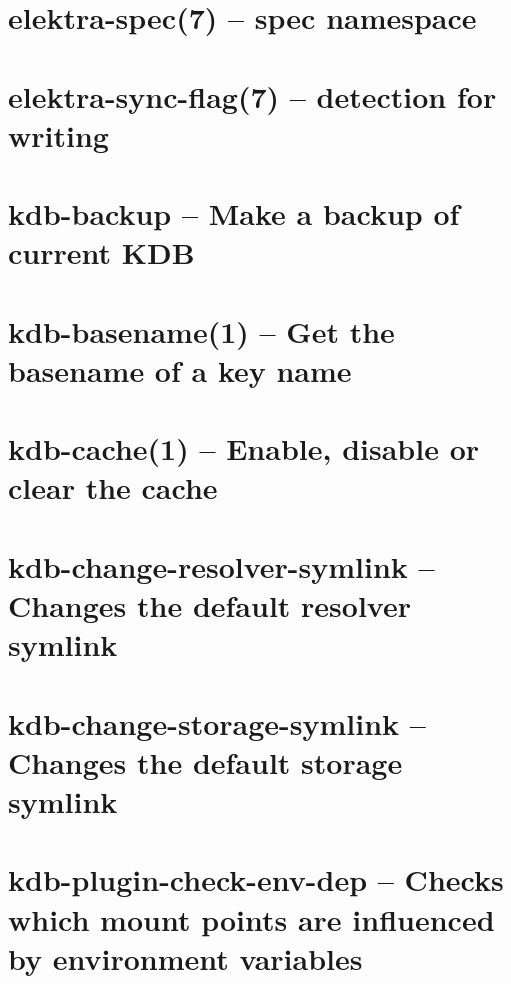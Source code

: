 \let\mypdfximage\pdfximage\def\pdfximage{\immediate\mypdfximage}\documentclass[twoside]{book}
\newcommand{\+}{\discretionary{\mbox{\scriptsize$\hookleftarrow$}}{}{}}
\begin{document}
\chapter{elektra-\/spec(7) -- spec namespace}
\label{doc_help_elektra-spec_md}

\chapter{elektra-\/sync-\/flag(7) -- detection for writing}
\label{doc_help_elektra-sync-flag_md}

\chapter{kdb-\/backup -- Make a backup of current KDB}
\label{doc_help_kdb-backup_md}

\chapter{kdb-\/basename(1) -- Get the basename of a key name}
\label{doc_help_kdb-basename_md}

\chapter{kdb-\/cache(1) -- Enable, disable or clear the cache}
\label{doc_help_kdb-cache_md}

\chapter{kdb-\/change-\/resolver-\/symlink -- Changes the default resolver symlink}
\label{doc_help_kdb-change-resolver-symlink_md}

\chapter{kdb-\/change-\/storage-\/symlink -- Changes the default storage symlink}
\label{doc_help_kdb-change-storage-symlink_md}

\chapter{kdb-\/plugin-\/check-\/env-\/dep -- Checks which mount points are influenced by environment variables}
\label{doc_help_kdb-check-env-dep_md}

\end{document}
